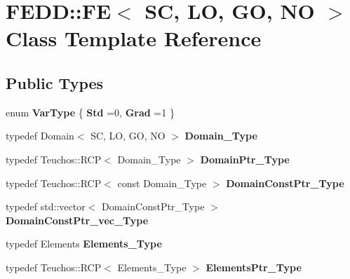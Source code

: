 \hypertarget{classFEDD_1_1FE}{}\section{F\+E\+DD\+:\+:FE$<$ SC, LO, GO, NO $>$ Class Template Reference}
\label{classFEDD_1_1FE}
\subsection*{Public Types}
\begin{DoxyCompactItemize}
\item 
\mbox{\label{classFEDD_1_1FE_aac2faf4705aa877f991c79d2db33d784}} 
enum {\bfseries Var\+Type} \{ {\bfseries Std} =0, 
{\bfseries Grad} =1
 \}
\item 
\mbox{\label{classFEDD_1_1FE_aa7368c2e2136802bd6e46afb27cbe95e}} 
typedef Domain$<$ SC, LO, GO, NO $>$ {\bfseries Domain\+\_\+\+Type}
\item 
\mbox{\label{classFEDD_1_1FE_afa601dd6fb404019f4d6209cf5c04d8d}} 
typedef Teuchos\+::\+R\+CP$<$ Domain\+\_\+\+Type $>$ {\bfseries Domain\+Ptr\+\_\+\+Type}
\item 
\mbox{\label{classFEDD_1_1FE_a0af2ea3760972bc13ac236ad8d99d77b}} 
typedef Teuchos\+::\+R\+CP$<$ const Domain\+\_\+\+Type $>$ {\bfseries Domain\+Const\+Ptr\+\_\+\+Type}
\item 
\mbox{\label{classFEDD_1_1FE_acb11bddbf3a0cc3d2d710d5e66d950b7}} 
typedef std\+::vector$<$ Domain\+Const\+Ptr\+\_\+\+Type $>$ {\bfseries Domain\+Const\+Ptr\+\_\+vec\+\_\+\+Type}
\item 
\mbox{\label{classFEDD_1_1FE_a310c24157c00aa997d6af71a10375a83}} 
typedef Elements {\bfseries Elements\+\_\+\+Type}
\item 
\mbox{\label{classFEDD_1_1FE_aefc1a6800950e0c48800982818ac631c}} 
typedef Teuchos\+::\+R\+CP$<$ Elements\+\_\+\+Type $>$ {\bfseries Elements\+Ptr\+\_\+\+Type}
\item 
\mbox{\label{classFEDD_1_1FE_a7cb97c97b43354268e8b0cd4e68582ad}} 

\end{DoxyCompactItemize}
